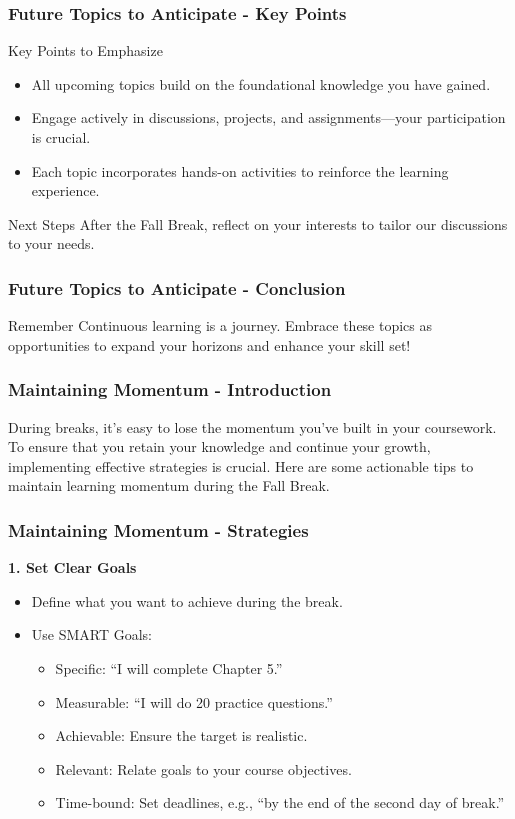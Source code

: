 \documentclass[aspectratio=169]{beamer}
\begin{document}
\begin{frame}[fragile]
    \frametitle{Future Topics to Anticipate - Key Points}
    \begin{block}{Key Points to Emphasize}
        \begin{itemize}
            \item All upcoming topics build on the foundational knowledge you have gained.
            \item Engage actively in discussions, projects, and assignments—your participation is crucial.
            \item Each topic incorporates hands-on activities to reinforce the learning experience.
        \end{itemize}
    \end{block}

    \begin{block}{Next Steps}
        After the Fall Break, reflect on your interests to tailor our discussions to your needs.
    \end{block}
\end{frame}

\begin{frame}[fragile]
    \frametitle{Future Topics to Anticipate - Conclusion}
    \begin{block}{Remember}
        Continuous learning is a journey. Embrace these topics as opportunities to expand your horizons and enhance your skill set!
    \end{block}
\end{frame}

\begin{frame}[fragile]
    \frametitle{Maintaining Momentum - Introduction}
    During breaks, it's easy to lose the momentum you've built in your coursework. To ensure that you retain your knowledge and continue your growth, implementing effective strategies is crucial. Here are some actionable tips to maintain learning momentum during the Fall Break.
\end{frame}

\begin{frame}[fragile]
    \frametitle{Maintaining Momentum - Strategies}
    \textbf{1. Set Clear Goals}
    \begin{itemize}
        \item Define what you want to achieve during the break.
        \item Use SMART Goals:
        \begin{itemize}
            \item Specific: ``I will complete Chapter 5.''
            \item Measurable: ``I will do 20 practice questions.''
            \item Achievable: Ensure the target is realistic.
            \item Relevant: Relate goals to your course objectives.
            \item Time-bound: Set deadlines, e.g., ``by the end of the second day of break.''
        \end{itemize}
    \end{itemize}
\end{frame}
\end{document}
